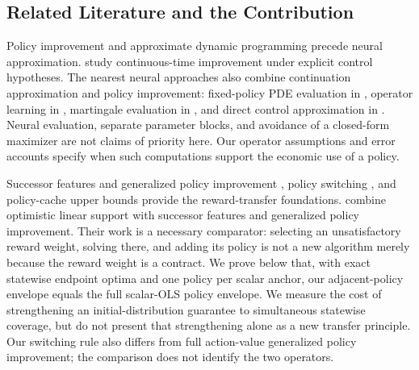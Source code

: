 \subsection{Related Literature and the Contribution}
Policy improvement and approximate dynamic programming precede neural approximation. \citet{jacka2015} study continuous-time improvement under explicit control hypotheses. The nearest neural approaches also combine continuation approximation and policy improvement: fixed-policy PDE evaluation in \citet{kim2025,kim2026}, operator learning in \citet{lee2024}, martingale evaluation in \citet{cai2025}, and direct control approximation in \citet{han2016}. Neural evaluation, separate parameter blocks, and avoidance of a closed-form maximizer are not claims of priority here. Our operator assumptions and error accounts specify when such computations support the economic use of a policy.

Successor features and generalized policy improvement \citep{barreto2017}, policy switching \citep{chang2021}, and policy-cache upper bounds \citep{nemecek2021} provide the reward-transfer foundations. \citet{alegre2022} combine optimistic linear support with successor features and generalized policy improvement. Their work is a necessary comparator: selecting an unsatisfactory reward weight, solving there, and adding its policy is not a new algorithm merely because the reward weight is a contract. We prove below that, with exact statewise endpoint optima and one policy per scalar anchor, our adjacent-policy envelope equals the full scalar-OLS policy envelope. We measure the cost of strengthening an initial-distribution guarantee to simultaneous statewise coverage, but do not present that strengthening alone as a new transfer principle. Our switching rule also differs from full action-value generalized policy improvement; the comparison does not identify the two operators.

